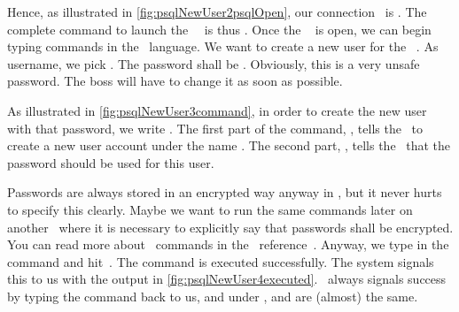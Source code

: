 %
Hence, as illustrated in \cref{fig:psqlNewUser2psqlOpen}, our connection~ is .
The complete command to launch the \psql\ \client\ is thus .
Once the \psql\  is open, we can begin typing commands in the \sql~language.%
%
%
%
We want to create a new user for the \psql\ \server.
As username, we pick .
The password shall be .
Obviously, this is a very unsafe password.
The boss will have to change it as soon as possible.%
%
\begin{sloppypar}%
As illustrated in \cref{fig:psqlNewUser3command}, in order to create the new user with that password, we write .
The first part of the command, , tells the \server\ to create a new user account under the name .
The second part, , tells the \server\ that the password  should be used for this user.%
\end{sloppypar}%
%
Passwords are always stored in an encrypted way anyway in \postgresql, but it never hurts to specify this clearly.
Maybe we want to run the same commands later on another \dbms\ where it is necessary to explicitly say that passwords shall be encrypted.
You can read more about \sql\ commands in the \postgresql\ reference~\cite{PGDG:PD:SC}.%
%
%
%
Anyway, we type in the command and hit~\keys{\enter}.
The command is executed successfully.
The system signals this to us with the output  in \cref{fig:psqlNewUser4executed}.
\psql\ always signals success by typing the command back to us, and under \postgresql,  and  are (almost) the same.

